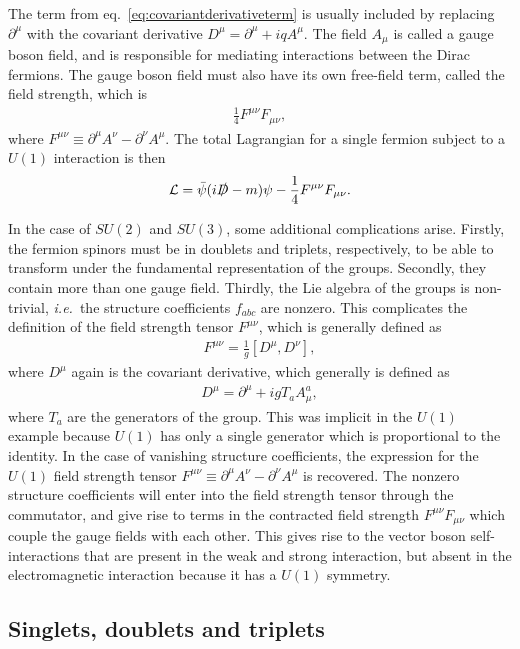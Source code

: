 \documentclass[twoside,english]{uiofysmaster}
\begin{document}
The term from eq.\ \eqref{eq:covariantderivativeterm} is usually included by replacing $\partial^\mu$ with the covariant derivative $D^\mu = \partial^\mu + iqA^\mu$. The field $A_\mu$ is called a gauge boson field, and is responsible for mediating interactions between the Dirac fermions. The gauge boson field must also have its own free-field term, called the field strength, which is
\begin{align}
	\frac{1}{4} F^{\mu\nu}F_{\mu\nu},
\end{align}
where $F^{\mu\nu} \equiv \partial^\mu A^\nu - \partial^\nu A^\mu.$ The total Lagrangian for a single fermion subject to a $U(1)$ interaction is then
\begin{align}
	\mathcal{L} = \bar \psi (i\slashed D - m)\psi - \frac{1}{4} F^{\mu\nu}F_{\mu\nu}.
\end{align}

In the case of $SU(2)$ and $SU(3)$, some additional complications arise. Firstly, the fermion spinors must be in doublets and triplets, respectively, to be able to transform under the fundamental representation of the groups. Secondly, they contain more than one gauge field. Thirdly, the Lie algebra of the groups is non-trivial, {\it i.e.}\ the structure coefficients $f_{abc}$ are nonzero. This complicates the definition of the field strength tensor $F^{\mu\nu}$, which is generally defined as
\begin{align}
	F^{\mu\nu} = \frac{1}{g}[D^\mu, D^\nu],
\end{align}
where $D^\mu$ again is the covariant derivative, which generally is defined as
\begin{align}
	D^\mu = \partial^\mu + ig T_a A^a_\mu,
\end{align}
where $T_a$ are the generators of the group. This was implicit in the $U(1)$ example because $U(1)$ has only a single generator which is proportional to the identity. In the case of vanishing structure coefficients, the expression for the $U(1)$ field strength tensor $F^{\mu\nu} \equiv \partial^\mu A^\nu - \partial^\nu A^\mu$ is recovered. The nonzero structure coefficients will enter into the field strength tensor through the commutator, and give rise to terms in the contracted field strength $F^{\mu\nu}F_{\mu\nu}$ which couple the gauge fields with each other. This gives rise to the vector boson self-interactions that are present in the weak and strong interaction, but absent in the electromagnetic interaction because it has a $U(1)$ symmetry.

\subsection{Singlets, doublets and triplets}
\end{document}
